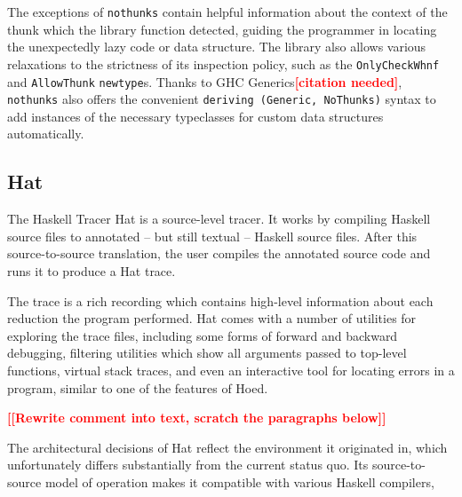 \documentclass[thesis=B,english]{FITthesis}[2019/12/23]
\newcommand{\todo}[1]{\textcolor{red}{\textbf{[[#1]]}}}
\newcommand{\citationNeeded}{\textcolor{red}{\textbf{[citation needed]}}}
\newcommand{\hackage}[1]{\texttt{#1}}
\newcommand{\hsType}[1]{\texttt{#1}}
\newcommand{\hsCode}[1]{\texttt{#1}}
\begin{document}
The exceptions of \hackage{nothunks} contain helpful information about the
context of the thunk which the library function detected, guiding the
programmer in locating the unexpectedly lazy code or data structure. The
library also allows various relaxations to the strictness of its inspection
policy, such as the \hsType{OnlyCheckWhnf} and \hsType{AllowThunk}
\hsCode{newtype}s. Thanks to GHC Generics\citationNeeded, \hackage{nothunks}
also offers the convenient \hsCode{deriving (Generic, NoThunks)} syntax to add
instances of the necessary typeclasses for custom data structures
automatically.


\subsection*{Hat} \label{sec:hat}
The Haskell Tracer Hat\cite{proj-hat} is a source-level tracer. It works by
compiling Haskell source files to annotated -- but still textual -- Haskell
source files. After this source-to-source translation, the user compiles the
annotated source code and runs it to produce a Hat trace.

The trace is a rich recording which contains high-level information about each
reduction the program performed. Hat comes with a number of utilities for
exploring the trace files, including some forms of forward and backward
debugging, filtering utilities which show all arguments passed to top-level
functions, virtual stack traces, and even an interactive tool for locating
errors in a program, similar to one of the features of Hoed.

\todo{Rewrite comment into text, scratch the paragraphs below}

The architectural decisions of Hat reflect the environment it originated in,
which unfortunately differs substantially from the current status quo. Its
source-to-source model of operation makes it compatible with various Haskell
compilers,
\end{document}
